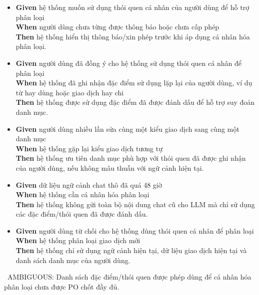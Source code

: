 \begin{itemize}
\item \textbf{Given} hệ thống muốn sử dụng thói quen cá nhân của người dùng để hỗ trợ phân loại  \\ \hspace*{1.5em}  \textbf{When} người dùng chưa từng được thông báo hoặc chưa cấp phép  \\ \hspace*{1.5em}  \textbf{Then} hệ thống hiển thị thông báo/xin phép trước khi áp dụng cá nhân hóa phân loại.
\item \textbf{Given} người dùng đã đồng ý cho hệ thống sử dụng thói quen cá nhân để phân loại  \\ \hspace*{1.5em}  \textbf{When} hệ thống đã ghi nhận đặc điểm sử dụng lặp lại của người dùng, ví dụ từ hay dùng hoặc giao dịch hay chi  \\ \hspace*{1.5em}  \textbf{Then} hệ thống được sử dụng đặc điểm đã được đánh dấu để hỗ trợ suy đoán danh mục.
\item \textbf{Given} người dùng nhiều lần sửa cùng một kiểu giao dịch sang cùng một danh mục  \\ \hspace*{1.5em}  \textbf{When} hệ thống gặp lại kiểu giao dịch tương tự  \\ \hspace*{1.5em}  \textbf{Then} hệ thống ưu tiên danh mục phù hợp với thói quen đã được ghi nhận của người dùng, nếu không mâu thuẫn với ngữ cảnh hiện tại.
\item \textbf{Given} dữ liệu ngữ cảnh chat thô đã quá 48 giờ  \\ \hspace*{1.5em}  \textbf{When} hệ thống cần cá nhân hóa phân loại  \\ \hspace*{1.5em}  \textbf{Then} hệ thống không gửi toàn bộ nội dung chat cũ cho LLM mà chỉ sử dụng các đặc điểm/thói quen đã được đánh dấu.
\item \textbf{Given} người dùng từ chối cho hệ thống dùng thói quen cá nhân để phân loại  \\ \hspace*{1.5em}  \textbf{When} hệ thống phân loại giao dịch mới  \\ \hspace*{1.5em}  \textbf{Then} hệ thống chỉ sử dụng ngữ cảnh hiện tại, dữ liệu giao dịch hiện tại và danh sách danh mục của người dùng.
\end{itemize}
\warningicon\  AMBIGUOUS: Danh sách đặc điểm/thói quen được phép dùng để cá nhân hóa phân loại chưa được PO chốt đầy đủ.




